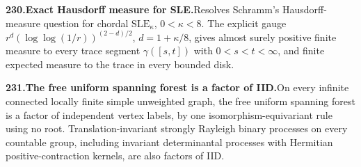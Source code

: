 \documentclass[11pt,a4paper]{article}
\begin{document}
  \par \begin{minipage}{\linewidth}
  \fontsize{10.5}{12.6}\selectfont\RaggedRight
  \hypertarget{result 230}{}
  {\bfseries\textcolor{muted}{230.}\enspace Exact Hausdorff measure for SLE.}\enspace Resolves Schramm’s Hausdorff-measure question for chordal $\mathrm{SLE}_\kappa$, $0<\kappa<8$. The explicit gauge $r^d(\log\log(1/r))^{(2-d)/2}$, $d=1+\kappa/8$, gives almost surely positive finite measure to every trace segment $\gamma([s,t])$ with $0<s<t<\infty$, and finite expected measure to the trace in every bounded disk.\par
  \end{minipage}\par\vspace{5pt}



  \par \begin{minipage}{\linewidth}
  \fontsize{10.5}{12.6}\selectfont\RaggedRight
  \hypertarget{result 231}{}
  {\bfseries\textcolor{muted}{231.}\enspace The free uniform spanning forest is a factor of IID.}\enspace On every infinite connected locally finite simple unweighted graph, the free uniform spanning forest is a factor of independent vertex labels, by one isomorphism-equivariant rule using no root. Translation-invariant strongly Rayleigh binary processes on every countable group, including invariant determinantal processes with Hermitian positive-contraction kernels, are also factors of IID.\par
  \end{minipage}\par\vspace{5pt}
\end{document}
